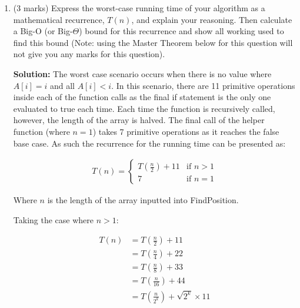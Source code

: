 \documentclass[a4,13pt]{extarticle}
\newenvironment{Solution}{\color{blue}\textbf{Solution:}}{}
\begin{document}
\begin{enumerate}
\begin{enumerate}
\begin{Solution}
				FindPositionHelper($[-1, 0, 2, 3, 10, 11, 23, 24, 102]$, $0$, $4$) \\
				\null\qquad middle $= 0 + \frac{4}{2} = 2$ \\
				\null\qquad if $A[2] = 2 \rightarrow$ true \\
				\null\qquad\qquad \textbf{return} true

	      	\end{Solution}
	      	      	      	                  
	      	\item (3 marks) Express the worst-case running time of your algorithm as a mathematical recurrence, $T(n)$, and explain your reasoning. Then calculate a Big-O (or Big-$\Theta$) bound for this recurrence and show all working used to find this bound (Note: using the Master Theorem below for this question will not give you any marks for this question).
	      	      
	      	      
			\begin{Solution}
				The worst case scenario occurs when there is no value where $A[i] = i$ and all $A[i] < i$. In this scenario, there are 11 primitive operations inside each of the function calls as the final if statement is the only one evaluated to true each time. Each time the function is recursively called, however, the length of the array is halved. The final call of the helper function (where $n = 1$) takes 7 primitive operations as it reaches the false base case. As such the recurrence for the running time can be presented as:

				\begin{align*}
					T(n) = \begin{cases}
						T(\frac{n}{2}) + 11 & \text{if } n > 1
						\\
						7 & \text{if } n = 1
					\end{cases}
				\end{align*}

				Where $n$ is the length of the array inputted into FindPosition. 

				Taking the case where $n > 1$:
				
				\begin{align*}
					T(n) & = T(\frac{n}{2}) + 11 \\
						 & = T(\frac{n}{4}) + 22 \\
						 & = T(\frac{n}{8}) + 33 \\
						 & = T(\frac{n}{16}) + 44 \\
						 & = T(\frac{n}{2^k}) + \sqrt{2^k} \times 11 \\
				\end{align*}


\end{Solution}
\end{enumerate}
\end{enumerate}
\end{document}
